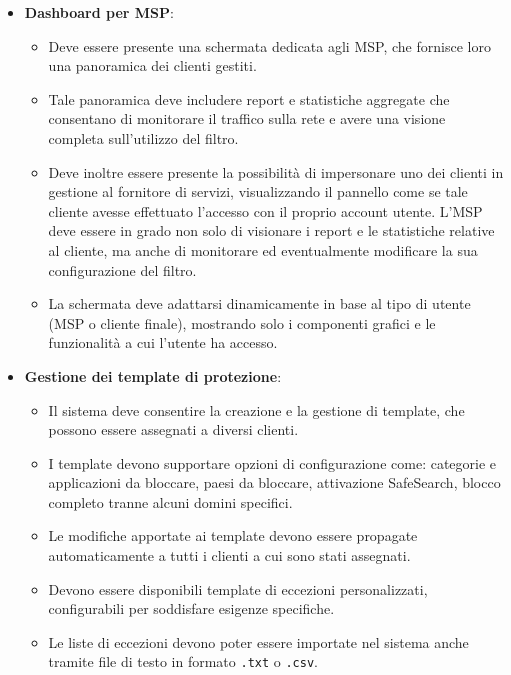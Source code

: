 \begin{itemize}
  \item \textbf{Dashboard per MSP}:
    \begin{itemize}
      \item Deve essere presente una schermata dedicata agli MSP, che fornisce loro una panoramica dei clienti gestiti.
      \item Tale panoramica deve includere report e statistiche aggregate che consentano di monitorare il traffico sulla rete e avere una visione completa sull'utilizzo del filtro.
      \item Deve inoltre essere presente la possibilità di impersonare uno dei clienti in gestione al fornitore di servizi, visualizzando il pannello come se tale cliente avesse effettuato l'accesso con il proprio account utente. L’MSP deve essere in grado non solo di visionare i report e le statistiche relative al cliente, ma anche di monitorare ed eventualmente modificare la sua configurazione del filtro.
      \item La schermata deve adattarsi dinamicamente in base al tipo di utente (MSP o cliente finale), mostrando solo i componenti grafici e le funzionalità a cui l’utente ha accesso.
    \end{itemize}

  \item \textbf{Gestione dei template di protezione}:
    \begin{itemize}
      \item Il sistema deve consentire la creazione e la gestione di template, che possono essere assegnati a diversi clienti.
      \item I template devono supportare opzioni di configurazione come: categorie e applicazioni da bloccare, paesi da bloccare, attivazione SafeSearch, blocco completo tranne alcuni domini specifici.
      \item Le modifiche apportate ai template devono essere propagate automaticamente a tutti i clienti a cui sono stati assegnati.
      \item Devono essere disponibili template di eccezioni personalizzati, configurabili per soddisfare esigenze specifiche.
      \item Le liste di eccezioni devono poter essere importate nel sistema anche tramite file di testo in formato \texttt{.txt} o \texttt{.csv}.
    \end{itemize}


\end{itemize}
